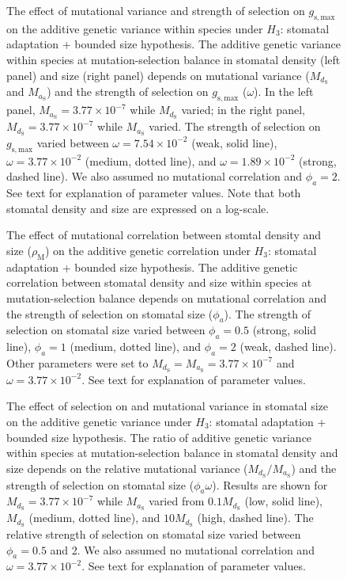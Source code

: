 \documentclass[
  letterpaper,
  DIV=11,
  numbers=noendperiod]{scrartcl}
\begin{document}
\newpage

\begin{figure}
\caption{The effect of mutational variance and strength of selection on $g_\mathrm{s,max}$ on the additive genetic variance within species under $H_3$: stomatal adaptation + bounded size hypothesis. The additive genetic variance within species at mutation-selection balance in stomatal density (left panel) and size (right panel) depends on mutational variance ($M_{d_\mathrm{S}}$ and $M_{a_\mathrm{S}}$) and the strength of selection on $g_\mathrm{s,max}$ ($\omega$). In the left panel, $M_{a_\mathrm{S}} = 3.77 \times 10^{-7}$ while $M_{d_\mathrm{S}}$ varied; in the right panel, $M_{d_\mathrm{S}} = 3.77 \times 10^{-7}$ while $M_{a_\mathrm{S}}$ varied. The strength of selection on $g_\mathrm{s,max}$ varied between $\omega = 7.54 \times 10^{-2}$ (weak, solid line), $\omega = 3.77 \times 10^{-2}$ (medium, dotted line), and $\omega = 1.89 \times 10^{-2}$ (strong, dashed line). We also assumed no mutational correlation and $\phi_a = 2$. See text for explanation of parameter values. Note that both stomatal density and size are expressed on a log-scale.}

\end{figure}

\newpage

\begin{figure}
\caption{The effect of mutational correlation between stomtal density and size ($\rho_\mathrm{M}$) on the additive genetic correlation under $H_3$: stomatal adaptation + bounded size hypothesis. The additive genetic correlation between stomatal density and size within species at mutation-selection balance depends on mutational correlation and the strength of selection on stomatal size ($\phi_a$). The strength of selection on stomatal size varied between $\phi_a = 0.5$ (strong, solid line), $\phi_a = 1$ (medium, dotted line), and $\phi_a = 2$ (weak, dashed line). Other parameters were set to $M_{d_\mathrm{S}} = M_{a_\mathrm{S}} = 3.77 \times 10^{-7}$ and $\omega = 3.77 \times 10^{-2}$. See text for explanation of parameter values.}

\end{figure}

\newpage

\begin{figure}
\caption{The effect of selection on and mutational variance in stomatal size on the additive genetic variance under $H_3$: stomatal adaptation + bounded size hypothesis. The ratio of additive genetic variance within species at mutation-selection balance in stomatal density and size depends on the relative mutational variance ($M_{d_\mathrm{S}} / M_{a_\mathrm{S}}$) and the strength of selection on stomatal size ($\phi_a \omega$). Results are shown for $M_{d_\mathrm{S}} = 3.77 \times 10^{-7}$ while $M_{a_\mathrm{S}}$ varied from $0.1 M_{d_\mathrm{S}}$ (low, solid line), $M_{d_\mathrm{S}}$ (medium, dotted line), and $10 M_{d_\mathrm{S}}$ (high, dashed line). The relative strength of selection on stomatal size varied between $\phi_a = 0.5$ and 2. We also assumed no mutational correlation and $\omega = 3.77 \times 10^{-2}$. See text for explanation of parameter values.}

\end{figure}
\end{document}
